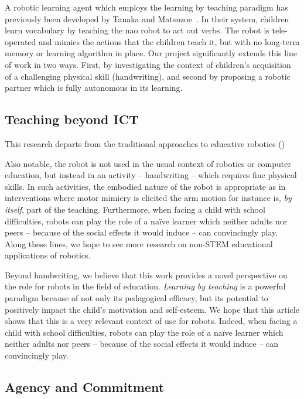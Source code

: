 \documentclass{article}
\begin{document}
A robotic learning agent which employs the learning by teaching paradigm has
previously been developed by Tanaka and Matsuzoe~\cite{Tanaka2012}. In their
system, children learn vocabulary by teaching the {\sc nao} robot to act out
verbs. The robot is tele-operated and mimics the actions that the children teach
it, but with no long-term memory or learning algorithm in place.  Our project
significantly extends this line of work in two ways. First, by investigating the
context of children's acquisition of a challenging physical skill (handwriting),
and second by proposing a robotic partner which is fully autonomous in its
learning.


\subsection{Teaching beyond ICT}

This research departs from the traditional approaches to educative robotics
()

Also notable, the robot is not used in the usual context of robotics or computer
education, but instead in an activity -- handwriting -- which requires fine
physical skills. In such activities, the embodied nature of the robot is
appropriate as in interventions where motor mimicry is elicited
\cite{Berninger1997} the arm motion for instance is, \emph{by itself}, part of
the teaching. Furthermore, when facing a child with school difficulties, robots
can play the role of a na\"ive learner which neither adults nor peers -- because
of the social effects it would induce -- can convincingly play. Along these
lines, we hope to see more research on non-STEM educational applications of
robotics.

Beyond handwriting, we believe that this work provides a novel perspective on
the role for robots in the field of education. \emph{Learning by teaching} is a
powerful paradigm because of not only its pedagogical efficacy, but its
potential to positively impact the child's motivation and self-esteem. We hope that 
this article shows that this is a very relevant context of use for robots. Indeed,
when facing a child with school difficulties, robots can play the role of a na\"ive 
learner which neither adults nor peers -- because of the social effects it would 
induce -- can convincingly play.

\subsection{Agency and Commitment}
\end{document}
